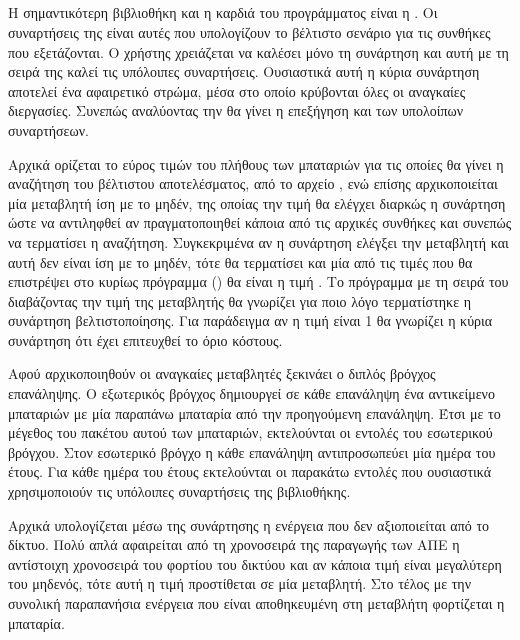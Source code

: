 \documentclass[12pt]{report}
\begin{document}
\subsection{{}}
Η σημαντικότερη βιβλιοθήκη και η καρδιά του προγράμματος είναι η {}. Οι συναρτήσεις της είναι αυτές που υπολογίζουν το βέλτιστο σενάριο για τις συνθήκες που εξετάζονται. Ο χρήστης χρειάζεται να καλέσει μόνο
τη συνάρτηση {\textbf{{}}} και αυτή με τη σειρά της καλεί τις υπόλοιπες συναρτήσεις. Ουσιαστικά αυτή η κύρια συνάρτηση αποτελεί ένα αφαιρετικό στρώμα, μέσα στο οποίο κρύβονται όλες οι αναγκαίες 
διεργασίες. Συνεπώς αναλύοντας την {\textbf{{}}} θα γίνει η επεξήγηση και των υπολοίπων συναρτήσεων.

Αρχικά ορίζεται το εύρος τιμών του πλήθους των μπαταριών για τις οποίες θα γίνει η αναζήτηση του βέλτιστου αποτελέσματος, από το αρχείο {}, ενώ επίσης αρχικοποιείται μία μεταβλητή {} ίση με το 
μηδέν, της οποίας την τιμή θα ελέγχει διαρκώς η συνάρτηση ώστε να αντιληφθεί αν
πραγματοποιηθεί κάποια από τις αρχικές συνθήκες και συνεπώς να τερματίσει η αναζήτηση. Συγκεκριμένα αν η συνάρτηση ελέγξει την μεταβλητή και αυτή δεν είναι ίση με το μηδέν, τότε θα τερματίσει και μία από τις τιμές
που θα επιστρέψει στο κυρίως πρόγραμμα ({}) θα είναι η τιμή {}. Το πρόγραμμα με τη σειρά του διαβάζοντας την τιμή της μεταβλητής θα γνωρίζει για ποιο λόγο τερματίστηκε η συνάρτηση βελτιστοποίησης.
Για παράδειγμα αν η τιμή είναι 1 θα γνωρίζει η κύρια συνάρτηση ότι έχει επιτευχθεί το όριο κόστους.

Αφού αρχικοποιηθούν οι αναγκαίες μεταβλητές ξεκινάει ο διπλός βρόγχος επανάληψης. Ο εξωτερικός βρόγχος δημιουργεί σε κάθε επανάληψη ένα αντικείμενο μπαταριών με μία παραπάνω μπαταρία από την προηγούμενη επανάληψη. Έτσι με το μέγεθος
του πακέτου αυτού των μπαταριών, εκτελούνται οι εντολές του εσωτερικού βρόγχου. Στον εσωτερικό βρόγχο η κάθε επανάληψη αντιπροσωπεύει μία ημέρα του έτους. Για κάθε ημέρα του έτους εκτελούνται οι παρακάτω εντολές που ουσιαστικά 
χρησιμοποιούν τις υπόλοιπες συναρτήσεις της βιβλιοθήκης.

Αρχικά υπολογίζεται μέσω της συνάρτησης {\textbf{{}}} η ενέργεια που δεν αξιοποιείται από το δίκτυο. Πολύ απλά αφαιρείται από τη χρονοσειρά της παραγωγής των ΑΠΕ η αντίστοιχη χρονοσειρά του φορτίου του δικτύου
και αν κάποια τιμή είναι μεγαλύτερη του μηδενός, τότε αυτή η τιμή προστίθεται σε μία μεταβλητή. Στο τέλος με την συνολική παραπανήσια ενέργεια που είναι αποθηκευμένη στη μεταβλήτη φορτίζεται η μπαταρία.
\end{document}
